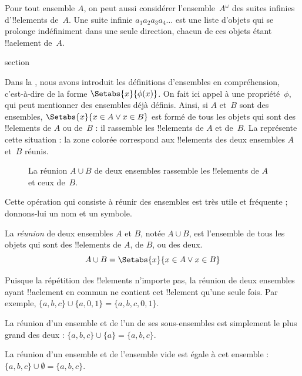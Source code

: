\documentclass[11pt,a4paper,openany]{memoir}
\begin{document}
\begin{ex}
Pour tout ensemble $A$, on peut aussi considérer l'ensemble~$A^\omega$
des suites infinies d'!!{element}s de~$A$. Une suite infinie
$a_1a_2a_3a_4\dots$ est une liste d'objets qui se prolonge
indéfiniment dans une seule direction, chacun de ces objets
étant !!a{element} de~$A$.
\end{ex}


\endgroup



\begingroup
\expandafter\def\csname ol@sectioncs\endcsname{section}
\def\olfilename{unions-and-intersections}



\begin{explain}
Dans la , nous avons introduit les définitions
d'ensembles en compréhension, c'est-à-dire de la forme
$\Setabs{x}{\phi(x)}$. On fait ici appel à une propriété~$\phi$,
qui peut mentionner des ensembles déjà définis. Ainsi, si $A$ et~$B$
sont des ensembles, $\Setabs{x}{x \in A \lor x \in B}$ est formé
de tous les objets qui sont des !!{element}s de $A$ ou de~$B$ :
il rassemble les !!{element}s de $A$ et de~$B$.
La  représente cette situation : la zone colorée
correspond aux !!{element}s des deux ensembles $A$ et~$B$ réunis.

\begin{figure}
  \caption{La réunion $A \cup B$ de deux ensembles rassemble
    les !!{element}s de $A$ et ceux de~$B$.}
\end{figure}

Cette opération qui consiste à réunir des ensembles est très
utile et fréquente ; donnons-lui un nom et un symbole.
\end{explain}

\begin{defn}[Réunion]
La \emph{réunion} de deux ensembles $A$ et $B$, notée $A \cup B$,
est l'ensemble de tous les objets qui sont des !!{element}s
de $A$, de $B$, ou des deux.
\[
A \cup B = \Setabs{x}{x \in A \lor x \in B}
\]
\end{defn}

\begin{ex}
Puisque la répétition des !!{element}s n'importe pas, la réunion de
deux ensembles ayant !!a{element} en commun ne contient cet
!!{element} qu'une seule fois. Par exemple,
$\{ a, b, c\} \cup \{ a, 0, 1\} = \{a, b, c, 0, 1\}$.

La réunion d'un ensemble et de l'un de ses sous-ensembles est
simplement le plus grand des deux :
$\{a, b, c \} \cup \{a \} = \{a, b, c\}$.

La réunion d'un ensemble et de l'ensemble vide est égale à
cet ensemble : $\{a, b, c \} \cup \emptyset = \{a, b, c \}$.
\end{ex}
\end{document}
